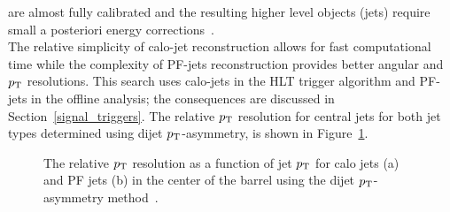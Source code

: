 are almost fully calibrated and the resulting higher level objects (jets) require small a posteriori 
energy corrections~\cite{Chatrchyan:2011ds}.\\
\indent The relative simplicity of calo-jet reconstruction allows for fast computational time while 
the complexity of PF-jets reconstruction provides better angular and $p_{\mathrm{T}}$ resolutions. This search 
uses calo-jets in the HLT trigger algorithm and PF-jets in the offline analysis; the consequences are 
discussed in Section~\ref{signal_triggers}. The relative $p_{\mathrm{T}}$ resolution for central jets for both 
jet types determined using dijet $p_{\mathrm{T}}$-asymmetry, is shown in Figure~\ref{fig:jetRes}. 

\begin{figure}[h!]
  \begin{center}
      \caption{\label{fig:jetRes} The relative $p_{\mathrm{T}}$ resolution as a function of jet $p_{\mathrm{T}}$
              for calo jets (a) and PF jets (b) in the center of the barrel using the dijet
              $p_{\mathrm{T}}$-asymmetry method~\cite{CMS-PAS-JME-10-014}.}
  \end{center}
\end{figure}

%
